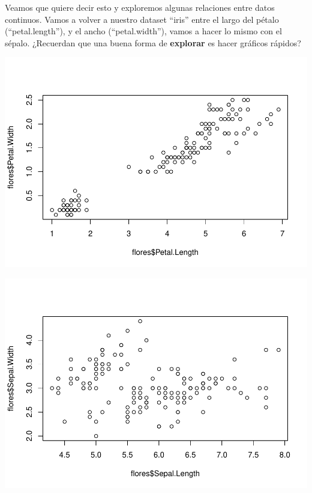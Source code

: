 \documentclass[
]{book}
\newenvironment{Shaded}{\begin{snugshade}}{\end{snugshade}}
\newcommand{\FunctionTok}[1]{\textcolor[rgb]{0.00,0.00,0.00}{#1}}
\newcommand{\NormalTok}[1]{#1}
\newcommand{\OtherTok}[1]{\textcolor[rgb]{0.56,0.35,0.01}{#1}}
\newcommand{\SpecialCharTok}[1]{\textcolor[rgb]{0.00,0.00,0.00}{#1}}
\begin{document}
Veamos que quiere decir esto y exploremos algunas relaciones entre datos continuos. Vamos a volver a nuestro dataset ``iris'' entre el largo del pétalo (``petal.length''), y el ancho (``petal.width''), vamos a hacer lo mismo con el sépalo. ¿Recuerdan que una buena forma de \textbf{explorar} es hacer gráficos rápidos?

\begin{Shaded}
\end{Shaded}

\includegraphics{Esatadistica_en_R_files/figure-latex/unnamed-chunk-205-1.pdf}

\begin{Shaded}
\end{Shaded}

\includegraphics{Esatadistica_en_R_files/figure-latex/unnamed-chunk-206-1.pdf}
\end{document}
